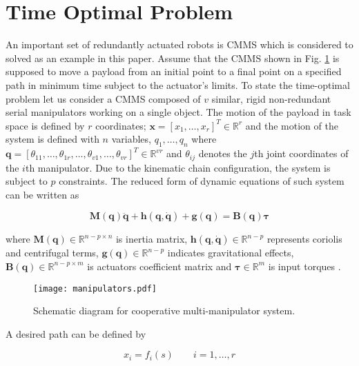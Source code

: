 \documentclass{rob}%
\begin{document}
\section{Time Optimal Problem}

An important set of redundantly actuated robots is CMMS which is considered to solved as an example in this paper.
Assume that the CMMS shown in Fig. \ref{fig:manipulator} is supposed to move a payload from an initial point to a final point on a specified path in minimum time subject to the actuator's limits. To state the time-optimal problem let us consider a CMMS composed of $ v $ similar, rigid non-redundant serial manipulators working on a single object. The motion of the payload in task space is defined by $ r $ coordinates; $ \boldsymbol x=[x_1, \dotso ,x_r]^T \in \mathbb{R}^{r}$ and the motion of the system is defined with $ n $ variables, $ q_1, \dotso ,q_n $ where $ \boldsymbol q=[\theta_{11}, \dotso ,\theta_{1r}, \dotso ,\theta_{v1}, \dotso ,\theta_{vr}]^T \in \mathbb{R}^{vr} $ and $ \theta_{ij} $  denotes the $ j $th joint coordinates of the $ i $th manipulator. Due to the kinematic chain configuration, the system is subject to $ p $ constraints. 
The reduced form of dynamic equations of such system can be written as

\begin{equation}
\label{eq:rde}
\mathbf{M}(\boldsymbol q)\ddot{\boldsymbol q}+\boldsymbol{h}(\boldsymbol q,\dot{\boldsymbol q})+\boldsymbol{g}(\boldsymbol q)=\mathbf{B}(\boldsymbol q) \boldsymbol{\tau}%
\end{equation}

\noindent
where $ \mathbf{M}(\boldsymbol q)\in \mathbb{R}^{n-p\times n}$ is inertia matrix, $ \boldsymbol{h}(\boldsymbol q,\dot{\boldsymbol q})\in \mathbb{R}^{n-p}$ represents coriolis and centrifugal terms,  $ \boldsymbol{g}(\boldsymbol q)\in \mathbb{R}^{n-p}$ indicates gravitational effects, $ \mathbf{B}(\boldsymbol q)\in \mathbb{R}^{n-p\times m}$ is actuators coefficient matrix and $ \boldsymbol{\tau}\in \mathbb{R}^{m} $ is input torques \cite{Ghasemi2008}.

\begin{figure}[!t]
	\centering
	\texttt{[image: manipulators.pdf]}
	\caption{Schematic diagram for cooperative multi-manipulator system.}
	\label{fig:manipulator}
\end{figure}

A desired path can be defined by

\begin{equation}
\label{eq:f}
x_{i}=f_{i}(s)\qquad
i=1, \dotso , r
\end{equation}
\end{document}
